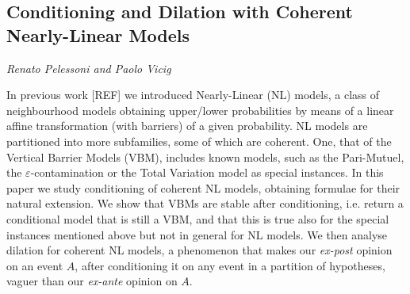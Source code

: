 \documentclass[../booklet.tex]{subfiles}
\begin{document}
\subsection[Conditioning and Dilation with Coherent Nearly-Linear Models. {\it Renato Pelessoni and Paolo Vicig}]{Conditioning and Dilation with Coherent Nearly-Linear Models}
 

\begin{center}
  {\it Renato Pelessoni and Paolo Vicig}
\end{center}

\vskip 0.8cm


In previous work [REF] we introduced Nearly-Linear (NL) models, a class of neighbourhood models obtaining upper/lower probabilities by means of a linear affine transformation (with barriers) of a given probability.
NL models are partitioned into more subfamilies, some of which are coherent.
One, that of the Vertical Barrier Models (VBM), includes known models, such as the Pari-Mutuel, the $\varepsilon$-contamination or the Total Variation model as special instances.
In this paper we study conditioning of coherent NL models, obtaining formulae for their natural extension.
We show that VBMs are stable after conditioning, i.e. return a conditional model that is still a VBM, and that this is true also for the special instances mentioned above but not in general for NL models. We then analyse dilation for coherent NL models, a phenomenon that makes our \emph{ex-post} opinion on an event $A$, after conditioning it on any event in a partition of hypotheses, vaguer than our \emph{ex-ante} opinion on $A$.

\end{document}
